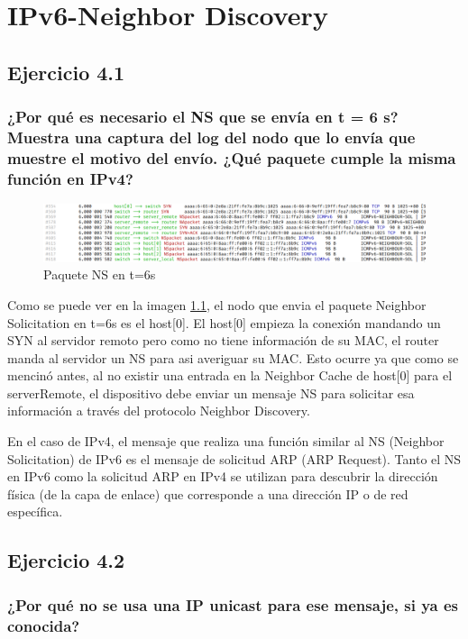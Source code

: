 \chapter{IPv6-Neighbor Discovery}
\label{chap:ipv6_nd}

\section{Ejercicio 4.1}
\subsection{¿Por qué es necesario el NS que se envía en t = 6 s? Muestra una captura del log del nodo que lo envía que muestre el motivo del envío. ¿Qué paquete cumple la misma función en IPv4?}

\begin{figure}[H]
    \centering   
    \includegraphics[width=135mm, scale=0.75]{imaxes/captura_ejer4_1.png}
    \caption{Paquete NS en t=6s}
    \label{fig:paquete_ns_t6}
\end{figure}

Como se puede ver en la imagen \ref{fig:paquete_ns_t6}, el nodo que envia el paquete Neighbor Solicitation en t=6s es el host[0]. El host[0] empieza la conexión mandando un SYN al servidor remoto pero como no tiene información de su MAC, el router manda al servidor un NS para asi averiguar su MAC. Esto ocurre ya que como se mencinó antes, al no existir una entrada en la Neighbor Cache de host[0] para el serverRemote, el dispositivo debe enviar un mensaje NS para solicitar esa información a través del protocolo Neighbor Discovery.


En el caso de IPv4, el mensaje que realiza una función similar al NS (Neighbor Solicitation) de IPv6 es el mensaje de solicitud ARP (ARP Request). Tanto el NS en IPv6 como la solicitud ARP en IPv4 se utilizan para descubrir la dirección física (de la capa de enlace) que corresponde a una dirección IP o de red específica.

\section{Ejercicio 4.2}
\subsection{¿Por qué no se usa una IP unicast para ese mensaje, si ya es conocida?}

